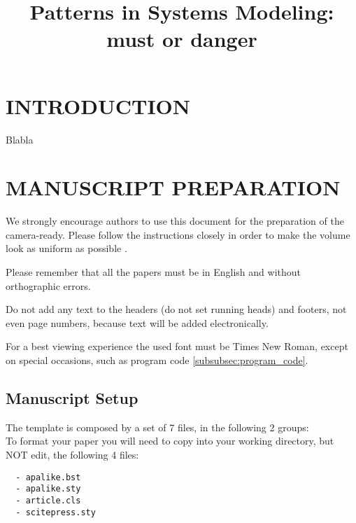 \documentclass[a4paper,twoside]{article}
\begin{document}
\title{Patterns in Systems Modeling: must or danger}

\author{
}



\onecolumn \maketitle \normalsize \vfill

\section{\uppercase{Introduction}}
\label{sec:introduction}

\noindent Blabla

\section{\uppercase{Manuscript Preparation}}

\noindent We strongly encourage authors to use this document for the
preparation of the camera-ready. Please follow the instructions
closely in order to make the volume look as uniform as possible
\cite{Moore99}.

Please remember that all the papers must be in English and without
orthographic errors.

Do not add any text to the headers (do not set running heads) and
footers, not even page numbers, because text will be added
electronically.

For a best viewing experience the used font must be Times New
Roman, except on special occasions, such as program code
\ref{subsubsec:program_code}.


\subsection{Manuscript Setup}

\noindent The template is composed by a set of 7 files, in the
following 2 groups:\\
 To format your paper you will need to copy
into your working directory, but NOT edit, the following 4 files:
\begin{verbatim}
  - apalike.bst
  - apalike.sty
  - article.cls
  - scitepress.sty
\end{verbatim}
\end{document}
